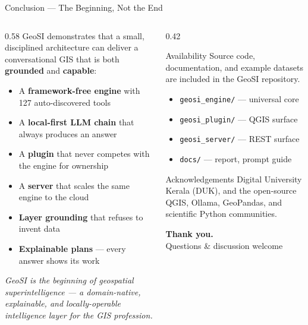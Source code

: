\documentclass[aspectratio=169,11pt]{beamer}
\newcommand{\kw}[1]{{\color{geositeal}\bfseries #1}}
\begin{document}
\begin{frame}{Conclusion --- The Beginning, Not the End}
  \begin{columns}[T,onlytextwidth]
    \begin{column}{0.58\textwidth}
      \small
      GeoSI demonstrates that a small, disciplined architecture can deliver a conversational GIS that is both \kw{grounded} and \kw{capable}:
      \begin{itemize}
        \item A \textbf{framework-free engine} with 127 auto-discovered tools
        \item A \textbf{local-first LLM chain} that always produces an answer
        \item A \textbf{plugin} that never competes with the engine for ownership
        \item A \textbf{server} that scales the same engine to the cloud
        \item \textbf{Layer grounding} that refuses to invent data
        \item \textbf{Explainable plans} --- every answer shows its work
      \end{itemize}

      \vspace{0.2em}
      \textit{GeoSI is the beginning of geospatial superintelligence --- a domain-native, explainable, and locally-operable intelligence layer for the GIS profession.}
    \end{column}
    \begin{column}{0.42\textwidth}
      \begin{block}{Availability}
        Source code, documentation, and example datasets are included in the GeoSI repository.
        \vspace{0.3em}
        \begin{itemize}\small
          \item \texttt{geosi\_engine/} --- universal core
          \item \texttt{geosi\_plugin/} --- QGIS surface
          \item \texttt{geosi\_server/} --- REST surface
          \item \texttt{docs/} --- report, prompt guide
        \end{itemize}
      \end{block}
      \begin{block}{Acknowledgements}
        \small Digital University Kerala (DUK), and the open-source QGIS, Ollama, GeoPandas, and scientific Python communities.
      \end{block}
      \centering
      \vspace{0.2em}
      {\color{geositeal}\Large\bfseries Thank you.}\\
      {\color{geosimuted}\small Questions \& discussion welcome}
    \end{column}
  \end{columns}
\end{frame}
\end{document}

